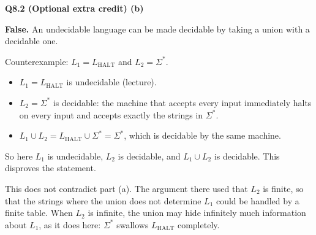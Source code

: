 \documentclass[11pt]{article}
\newcommand{\Lh}{L_{\text{HALT}}}
\newcommand{\qpage}[1]{\clearpage\noindent\textbf{\large #1}\par\medskip}
\begin{document}
\qpage{Q8.2 (Optional extra credit) (b)}

\textbf{False.} An undecidable language can be made decidable by taking a union with a decidable one.

Counterexample: $L_1 = \Lh$ and $L_2 = \Sigma^*$.
\begin{itemize}
  \item $L_1 = \Lh$ is undecidable (lecture).
  \item $L_2 = \Sigma^*$ is decidable: the machine that accepts every input immediately halts on every input and accepts exactly the strings in $\Sigma^*$.
  \item $L_1 \cup L_2 = \Lh \cup \Sigma^* = \Sigma^*$, which is decidable by the same machine.
\end{itemize}
So here $L_1$ is undecidable, $L_2$ is decidable, and $L_1 \cup L_2$ is decidable.
This disproves the statement.

This does not contradict part (a).
The argument there used that $L_2$ is finite, so that the strings where the union does not determine $L_1$ could be handled by a finite table.
When $L_2$ is infinite, the union may hide infinitely much information about $L_1$, as it does here: $\Sigma^*$ swallows $\Lh$ completely.
\end{document}
